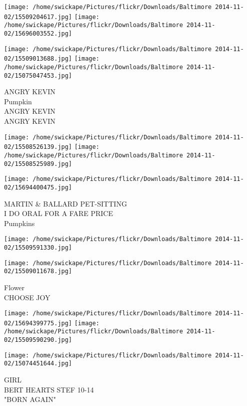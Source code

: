 \documentclass[10pt,letterpaper]{article}
\begin{document}
\texttt{[image: /home/swickape/Pictures/flickr/Downloads/Baltimore 2014-11-02/15509204617.jpg]}
\texttt{[image: /home/swickape/Pictures/flickr/Downloads/Baltimore 2014-11-02/15696003552.jpg]}

\texttt{[image: /home/swickape/Pictures/flickr/Downloads/Baltimore 2014-11-02/15509013688.jpg]}
\texttt{[image: /home/swickape/Pictures/flickr/Downloads/Baltimore 2014-11-02/15075047453.jpg]}

ANGRY KEVIN\\
Pumpkin\\
ANGRY KEVIN\\
ANGRY KEVIN\\
\pagebreak

\texttt{[image: /home/swickape/Pictures/flickr/Downloads/Baltimore 2014-11-02/15508526139.jpg]}
\texttt{[image: /home/swickape/Pictures/flickr/Downloads/Baltimore 2014-11-02/15508525989.jpg]}

\vspace{0.25in}
\texttt{[image: /home/swickape/Pictures/flickr/Downloads/Baltimore 2014-11-02/15694400475.jpg]}

MARTIN \& BALLARD PET{-}SITTING\\
I DO ORAL FOR A FARE PRICE\\
Pumpkins\\
\pagebreak

\texttt{[image: /home/swickape/Pictures/flickr/Downloads/Baltimore 2014-11-02/15509591330.jpg]}

\vspace{0.25in}
\texttt{[image: /home/swickape/Pictures/flickr/Downloads/Baltimore 2014-11-02/15509011678.jpg]}

Flower\\
CHOOSE JOY\\
\pagebreak

\texttt{[image: /home/swickape/Pictures/flickr/Downloads/Baltimore 2014-11-02/15694399775.jpg]}
\texttt{[image: /home/swickape/Pictures/flickr/Downloads/Baltimore 2014-11-02/15509590290.jpg]}

\vspace{0.25in}
\texttt{[image: /home/swickape/Pictures/flickr/Downloads/Baltimore 2014-11-02/15074451644.jpg]}

GIRL\\
BERT HEARTS STEF 10{-}14\\
"BORN AGAIN"\\
\pagebreak
\end{document}
